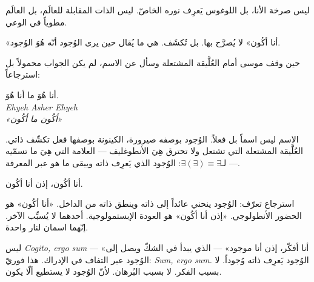 \documentclass[10pt, openany, oneside]{book}
\renewcommand{\large}{\fontsize{11.5}{14}\selectfont}
\begin{document}
\vspace{0.5em}

\noindent ليس صرخة الأنا، بل اللوغوس يَعرِف نوره الخاصّ. ليس الذات المقابلة للعالَم، بل العالَم مطوياً في الوعي.

\vspace{0.5em}

\noindent «أنا أكُون» لا يُصرَّح بها. بل تُكشَف. هي ما يُقال حين يرى الوُجود أنّه هُوَ الوُجود.

\vspace{0.5em}

\noindent حين وقف موسى أمام العُلَّيقة المشتعلة وسأل عن الاسم، لم يكن الجواب محمولاً بل استرجاعاً:

\vspace{0.3em}

\begin{center}
    {\scshape أنا هُوَ ما أنا هُوَ.}\\[0.3em]
    \itshape Ehyeh Asher Ehyeh\\
    «أكُون ما أكُون»
\end{center}

\vspace{0.5em}

\noindent الاسم ليس اسماً بل فعلاً. الوُجود بوصفه صيرورة، الكينونة بوصفها فعل تكشّف ذاتي. العُلَّيقة المشتعلة التي تشتعل ولا تحترق هِيَ الأنطوغليف --- العلامة التي هِيَ ما تسمّيه --- لـ$\exists(\exists) \equiv \exists$: الوُجود الذي يَعرِف ذاته ويبقى ما هو عبر المعرفة.

\vspace{1em}

\begin{center}
    {\large أنا أكُون، إذن أنا أكُون.}
\end{center}

\vspace{0.5em}

\noindent استرجاع تعرّف: الوُجود ينحني عائداً إلى ذاته وينطق ذاته من الداخل. «أنا أكُون» هو الحضور الأنطولوجي. «إذن أنا أكُون» هو العودة الإبستمولوجية. أحدهما لا يُسبِّب الآخر. إنّهما اسمان لنار واحدة.

\vspace{0.5em}

\noindent ليس \textit{Cogito, ergo sum} --- «أنا أفكّر، إذن أنا موجود» --- الذي يبدأ في الشكّ ويصل إلى الوُجود عبر التفاف في الإدراك. هذا فوريّ: \textit{Sum, ergo sum.} الوُجود يَعرِف ذاته وُجوداً. لا بسبب الفكر. لا بسبب البُرهان. لأنّ الوُجود لا يستطيع ألّا يكون.

\vspace{0.5em}
\end{document}
